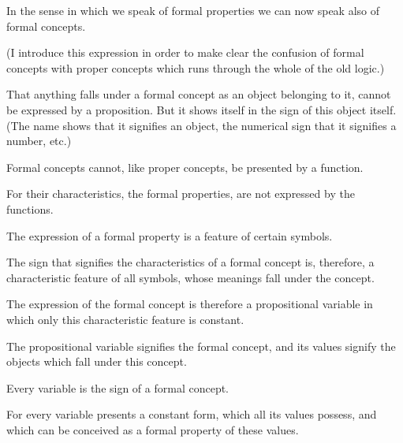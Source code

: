 {In the sense in which we speak of formal
properties we can now speak also of formal
concepts.

(I introduce this expression in order to make
clear the confusion of formal concepts with proper
concepts which runs through the whole of the old
logic.)

That anything falls under a formal concept as
an object belonging to it, cannot be expressed by
a proposition. But it shows itself in the sign of
this object itself. (The name shows that it signifies
an object, the numerical sign that it signifies a
number, etc.)

Formal concepts cannot, like proper concepts,
be presented by a function.

For their characteristics, the formal properties,
are not expressed by the functions.

The expression of a formal property is a feature
of certain symbols.

The sign that signifies the characteristics of a
formal concept is, therefore, a characteristic feature
of all symbols, whose meanings fall under the
concept.

The expression of the formal concept is therefore
a propositional variable in which only this
characteristic feature is constant.}


{The propositional variable signifies the formal
concept, and its values signify the objects which
fall under this concept.}


{Every variable is the sign of a formal
concept.

For every variable presents a constant form,
which all its values possess, and which can
be conceived as a formal property of these
values.}


